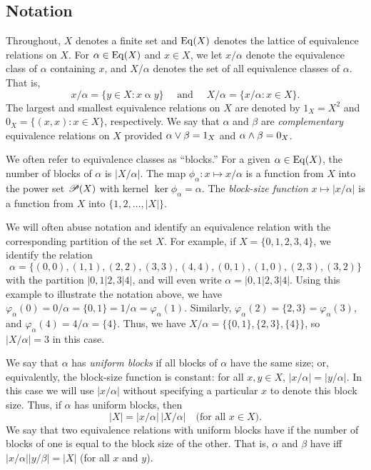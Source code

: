 \subsection{Notation}
Throughout, $X$ denotes a finite set and $\operatorname{Eq}(X)$ denotes the lattice of
equivalence relations on $X$. For $\alpha \in \operatorname{Eq}(X)$ and $x\in X$, we
let $x/\alpha$ denote the equivalence class of $\alpha$ containing $x$, and 
$X/\alpha$ denotes the set of all equivalence classes of $\alpha$. That is,
\[
x/\alpha = \{y\in X : x \mathrel{ \alpha } y\} \quad \text{ and } \quad
X/\alpha = \{x/\alpha : x\in X \}.
\]
The largest and smallest equivalence relations on $X$ are denoted by $1_X = X^2$
and $0_X = \{(x,x) : x \in X\}$, respectively.
We say that $\alpha$ and $\beta$ are \emph{complementary} equivalence relations
on $X$ provided $\alpha \vee \beta = 1_X$ and $\alpha \wedge \beta = 0_X$.


We often refer to equivalence classes as
``blocks.''  
For a given $\alpha\in \operatorname{Eq}(X)$, the number of blocks 
of $\alpha$ is $|X/\alpha|$. The map $\phi_\alpha: x \mapsto x/\alpha$ is a
function from $X$ into the power set $\mathscr{P}(X)$
with kernel $\ker \phi_\alpha = \alpha$.
The \emph{block-size function} $x \mapsto |x/\alpha|$ is a function from $X$ 
into $\{1,2,\dots, |X|\}$. 

We will often abuse notation and identify an equivalence relation with the
corresponding partition of the set $X$.  For example, if $X = \{0,1,2,3,4\}$, 
we identify the relation 
\[
\alpha = \{(0,0), (1,1), (2,2), (3,3), (4,4), (0,1), (1,0), (2,3), (3,2)\}%
\]
with the partition $|0,1|2,3|4|$, and will even write $\alpha = |0,1|2,3|4|$. 
Using this example to illustrate the notation above, we have
$\varphi_\alpha(0) = 0/\alpha = \{0,1\} = 1/\alpha = \varphi_\alpha(1)$.
Similarly, $\varphi_\alpha(2) = \{2,3\}= \varphi_\alpha(3)$, and 
$\varphi_\alpha(4) = 4/\alpha = \{4\}$.  Thus, we have $X/\alpha = \{\{0,1\}, \{2,3\}, \{4\}\}$, so
$|X/\alpha| = 3$ in this case.

We say that $\alpha$ has \emph{uniform blocks} if all blocks of  $\alpha$ have
the same size; or, equivalently, the block-size function is constant: for all 
$x, y \in X$, $|x/\alpha| = |y/\alpha|$.  
In this case we will use $|x/\alpha|$ without specifying
a particular $x$ to denote this block size.
Thus, if $\alpha$
has uniform blocks, then
\[
|X|= |x/\alpha| \,|X/\alpha| %
\quad \text{(for all $x\in X$).}
\]
We say that two equivalence relations with uniform
blocks  have 
 if the number of blocks of one is equal to
the block size of the other. That is,
$\alpha$ and $\beta$ 
have \cubs
iff $|x/\alpha||y/\beta| = |X|$ (for all $x$ and $y$).


